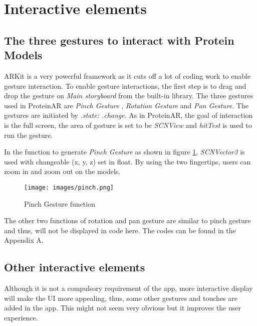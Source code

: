 \section{Interactive elements}
\subsection{The three gestures to interact with Protein Models}
ARKit is a very powerful framework as it cuts off a lot of coding work to enable gesture interaction. To enable gesture interactions, the first step is to drag and drop the gesture on \emph{Main storyboard} from the built-in library. The three gestures used in ProteinAR are \emph{Pinch Gesture} , \emph{Rotation Gesture} and \emph{Pan Gesture}. The gestures are initiated by \emph{.state: .change}. As in ProteinAR, the goal of interaction is the full screen, the area of gesture is set to be \emph{SCNView} and \emph{hitTest} is used to run the gesture. 

In the function to generate \emph{Pinch Gesture} as shown in figure \ref{fig:pinch}, \emph{SCNVector3} is used with changeable (x, y, z) set in float. By using the two fingertips, users can zoom in and zoom out on the models. 
\begin{figure}[!htp]
	\centering
	\texttt{[image: images/pinch.png]}
	\caption{Pinch Gesture function}
	\label{fig:pinch}
\end{figure}
The other two functions of rotation and pan gesture are similar to pinch gesture and thus, will not be displayed in code here. The codes can be found in the Appendix A. 

\subsection{Other interactive elements}
Although it is not a compulsory requirement of the app, more interactive display will make the UI more appealing, thus, some other gestures and touches are added in the app. This might not seem very obvious but it improves the user experience.
